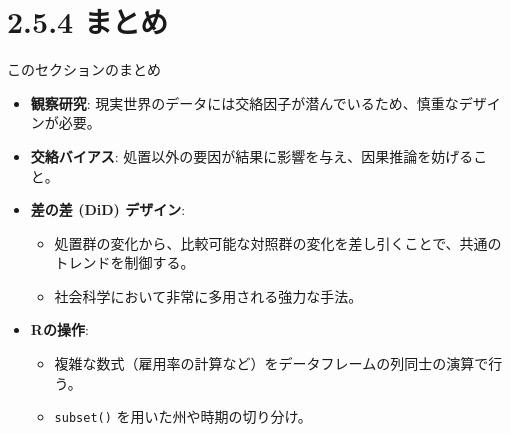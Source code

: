 \documentclass[
  ignorenonframetext,
]{beamer}
\providecommand{\tightlist}{%
  \setlength{\itemsep}{0pt}\setlength{\parskip}{0pt}}
\begin{document}
\hypertarget{ux307eux3068ux3081}{%
\section{2.5.4 まとめ}\label{ux307eux3068ux3081}}

\begin{frame}[fragile]{このセクションのまとめ}
\protect\hypertarget{ux3053ux306eux30bbux30afux30b7ux30e7ux30f3ux306eux307eux3068ux3081}{}
\begin{itemize}
\tightlist
\item
  \textbf{観察研究}:
  現実世界のデータには交絡因子が潜んでいるため、慎重なデザインが必要。
\item
  \textbf{交絡バイアス}:
  処置以外の要因が結果に影響を与え、因果推論を妨げること。
\item
  \textbf{差の差 (DiD) デザイン}:

  \begin{itemize}
  \tightlist
  \item
    処置群の変化から、比較可能な対照群の変化を差し引くことで、共通のトレンドを制御する。
  \item
    社会科学において非常に多用される強力な手法。
  \end{itemize}
\item
  \textbf{Rの操作}:

  \begin{itemize}
  \tightlist
  \item
    複雑な数式（雇用率の計算など）をデータフレームの列同士の演算で行う。
  \item
    \texttt{subset()} を用いた州や時期の切り分け。
  \end{itemize}
\end{itemize}
\end{frame}
\end{document}
